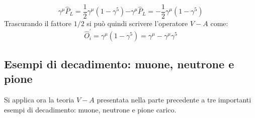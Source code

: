 \documentclass{subnucbo}
\begin{document}
\begin{subequations}
        \begin{equation}
                \gamma ^ { \mu } \hat { P } _ { L }  = \frac { 1 } { 2 } \gamma ^ { \mu } \left( 1 - \gamma ^ { 5 } \right)
                \label{subeq:pvp_exp}
        \end{equation}
        \begin{equation}
                - \gamma ^ { \mu } \hat { P } _ { L } = - \frac { 1 } { 2 } \gamma ^ { \mu } \left( 1 - \gamma ^ { 5 } \right)
                \label{subeq:pap_exp}
        \end{equation}
\end{subequations}
Trascurando il fattore $1/2$ si può quindi scrivere l'operatore $V-A$ come:
\begin{equation}
        \hat { O } _ { i } ^ { \prime } = \gamma ^ { \mu } \left( 1 - \gamma ^ { 5 } \right) = \gamma ^ { \mu } - \gamma ^ { \mu } \gamma ^ { 5 }
        \label{eq:va_operator}
\end{equation}

\subsection{Esempi di decadimento: muone, neutrone e pione}
\label{subsec:decays}
Si applica ora la teoria $V-A$ presentata nella parte precedente a tre importanti esempi di decadimento: muone, neutrone e pione carico.
\end{document}
